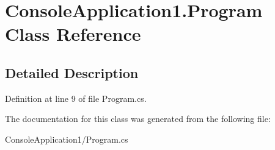 \hypertarget{class_console_application1_1_1_program}{
\section{ConsoleApplication1.Program Class Reference}
\label{class_console_application1_1_1_program}
}


\subsection{Detailed Description}


Definition at line 9 of file Program.cs.



The documentation for this class was generated from the following file:\begin{DoxyCompactItemize}
\item 
ConsoleApplication1/Program.cs\end{DoxyCompactItemize}
